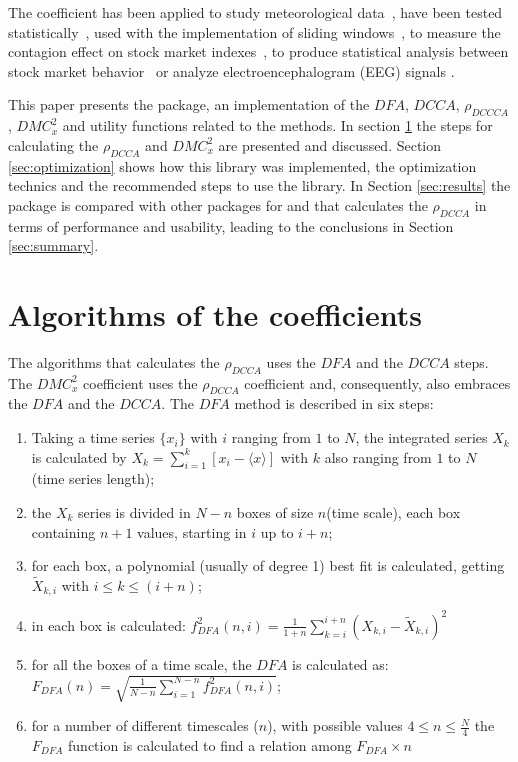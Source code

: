 \documentclass[nojss]{jss}
\begin{document}
The coefficient has been applied to study meteorological data~\citep{Brito2019}, have been tested statistically~\citep{filho2021-2}, used with the implementation of sliding windows~\citep{guedes2021-2}, to measure the contagion effect on stock market indexes~\citep{guedes2022d}, to produce statistical analysis between stock market behavior~\citep{zebende2022s} or analyze electroencephalogram (EEG) signals \citep{RIBEIRO2025107419}.

This paper presents the   package, an implementation of the $DFA$, $DCCA$, $\rho_{DCCCA}$, $DMC_x^2$ and utility functions related to the methods. In section \ref{sec:calculations} the steps for calculating the $\rho_{DCCA}$ and $DMC_x^2$ are presented and discussed. Section \ref{sec:optimization} shows how this library was implemented, the optimization technics and the recommended steps to use the library. In Section \ref{sec:results} the  package is compared with other packages for  and  that calculates the $\rho_{DCCA}$ in terms of performance and usability, leading to the conclusions in Section \ref{sec:summary}.

\section{Algorithms of the coefficients}\label{sec:calculations}

The algorithms that calculates the $\rho_{DCCA}$ uses the $DFA$ and the $DCCA$ steps. The $DMC_x^2$ coefficient uses the $\rho_{DCCA}$ coefficient and, consequently, also embraces the $DFA$ and the $DCCA$. The $DFA$ method is described in six steps:


\begin{enumerate}\label{steps:dfa}

  \item Taking a time series $\{x_{i}\}$ with $i$ ranging from $1$ to $N$, the integrated series $X_{k}$ is calculated by $X_{k} = \sum_{i=1}^{k}\left[x_{i} - \langle x \rangle \right]$ with \(k\) also ranging from $1$ to $N$ (time series length);
  \item the  $X_{k}$ series is divided in $N - n$ boxes of size $n$(time scale), each box containing $n + 1$ values, starting in $i$ up to $i + n$;
  \item for each box, a polynomial (usually of degree 1) best fit is calculated, getting $\widetilde{X}_{k, i}$ with $i \le k \le (i + n)$;
  \item in each box is calculated: $f_{DFA}^{2}(n, i) = \frac{1}{1+n} \sum_{k=i}^{i + n}(X_{k,i}-\widetilde{X}_{k,i})^{2}$
  \item for all the boxes of a time scale, the $DFA$ is calculated as:\\[10pt]
        $F_{DFA}(n) = \sqrt{\frac{1}{N - n} \sum_{i=1}^{N-n} f_{DFA}^{2}(n, i)}$;
  \item for a number of different timescales ($n$), with possible values $4 \le n \le \frac{N}{4}$ the $F_{DFA}$ function is calculated to find a relation among $F_{DFA} \times n$

\end{enumerate}
\end{document}
